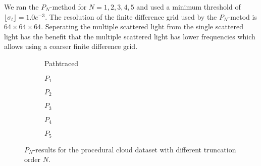 We ran the $P_N$-method for $N={1,2,3,4,5}$ and used a minimum threshold of $\lfloor\sigma_t\rfloor=1.0e^{-3}$. The resolution of the finite difference grid used by the $P_N$-metod is $64\times 64\times 64$. Seperating the multiple scattered light from the single scattered light has the benefit that the multiple scattered light has lower frequencies which allows using a coarser finite difference grid.
\begin{figure}[h]
\centering
\begin{subfigure}{0.49\columnwidth}
\caption{Pathtraced}
\label{fig:pn_results_nebulae1_pathtraced}
\end{subfigure}%
\hspace{0.01\columnwidth}
\begin{subfigure}{0.49\columnwidth}
\caption{$P_1$}
\label{fig:pn_results_nebulae1_P1}
\end{subfigure}%

\begin{subfigure}{0.49\columnwidth}
\caption{$P_2$}
\label{fig:pn_results_nebulae1_P2}
\end{subfigure}%
\hspace{0.01\columnwidth}
\begin{subfigure}{0.49\columnwidth}
\caption{$P_3$}
\label{fig:pn_results_nebulae1_P3}
\end{subfigure}%


\begin{subfigure}{0.49\columnwidth}
\caption{$P_4$}
\label{fig:pn_results_nebulae1_P4}
\end{subfigure}%
\hspace{0.01\columnwidth}
\begin{subfigure}{0.49\columnwidth}
\caption{$P_5$}
\label{fig:pn_results_nebulae1_P5}
\end{subfigure}%
\caption{$P_N$-results for the procedural cloud dataset with different truncation order $N$.}
\label{fig:pn_results_nebulae1}
\end{figure}
